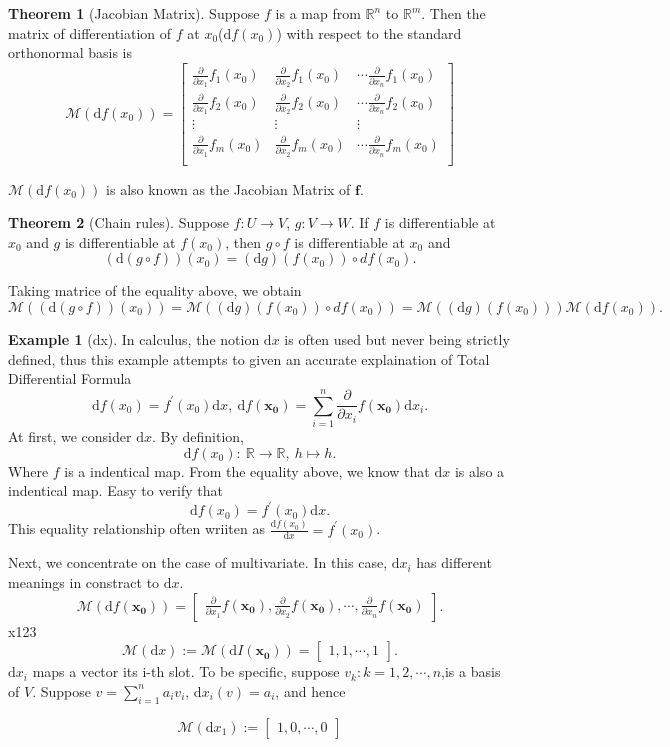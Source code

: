 \documentclass[12pt]{book}
\theoremstyle{definition}
\newtheorem{example}{Example}[chapter]
\newtheorem{theorem}{Theorem}[chapter]
\newcommand{\R}{\mathbb{R}}
\newcommand{\f}{\mathbf{f}}
\newcommand{\drm}{\mathrm{d}}
\newcommand{\M}{\mathcal{M}}
\newcommand{\pd}[1]{\frac{\partial}{\partial #1}}
\begin{document}
\begin{theorem}[Jacobian Matrix]
Suppose $f$ is a map from $\R^n$ to $\R^m$. Then the matrix of differentiation of $f$ at $x_0$($\drm f(x_0)$) with respect to the standard orthonormal basis is
$$
\mathcal{M}(\drm f(x_0)) = 
\begin{bmatrix}
	\pd{x_1}f_1(x_0) & \pd{x_2}f_1(x_0) & \cdots \pd{x_n}f_1(x_0) \\
	\pd{x_1}f_2(x_0) & \pd{x_2}f_2(x_0) & \cdots \pd{x_n}f_2(x_0) \\
	\vdots & \vdots  &\vdots \\
	\pd{x_1}f_m(x_0) & \pd{x_2}f_m(x_0) & \cdots \pd{x_n}f_m(x_0) \\
\end{bmatrix}
$$
\end{theorem}
$\mathcal{M}(\drm f(x_0))$ is also known as the Jacobian Matrix of $\f$.
\begin{theorem}[Chain rules]\label{Chain rules}
Suppose $f:U \to V$, $g:V \to W$. If $f$ is differentiable at $x_0$ and $g$ is differentiable at $f(x_0)$, then $g \circ f$ is differentiable at $x_0$ and 
$$
(\drm(g \circ f))(x_0) = (\drm g)(f(x_0)) \circ d f(x_0). 
$$
\end{theorem}
Taking matrice of the equality above, we obtain
$$
\mathcal{M}((\drm(g \circ f))(x_0))=\mathcal{M}((\drm g)(f(x_0)) \circ d f(x_0))= \mathcal{M}((\drm g)(f(x_0))) \mathcal{M}(\drm f(x_0)).
$$
\begin{example}[dx]
In calculus, the notion $\drm x$ is often used but never being strictly defined, thus this example attempts to given an accurate explaination of Total Differential Formula
$$
\drm f(x_0) = f^\prime(x_0)\drm x,\ \drm f(\mathbf{x_0}) = \sum_{i=1}^{n} \pd{x_i}f(\mathbf{x_0}) \drm x_i.   
$$
At first, we consider $\drm x$. By definition, 
$$
\drm f(x_0): \ \R \to \R,\  h \mapsto h. 
$$
Where $f$ is a indentical map. From the equality above, we know that $\drm x$ is also a  indentical map. Easy to verify that
$$
\drm f(x_0) = f^\prime(x_0)\drm x. 
$$
This equality relationship often wriiten as $\frac{\drm f(x_0)}{\drm x}=f^\prime(x_0)$. \par
Next, we concentrate on the case of multivariate. In this case, $\drm x_i$ has different meanings in constract to $\drm x$.
$$
\M(\drm f(\mathbf{x_0})) = \begin{bmatrix}
	\pd{x_1}f(\mathbf{x_0}), \pd{x_2}f(\mathbf{x_0}), \cdots, \pd{x_n}f(\mathbf{x_0})
\end{bmatrix}.
$$
x123
$$
\M(\drm x):= \M(\drm I(\mathbf{x_0})) = \begin{bmatrix}
	1,1,\cdots,1
\end{bmatrix}.
$$
$\drm x_i$ maps a vector its i-th slot. To be specific, suppose ${v_k:k=1,2,\cdots,n}$,is a basis of $V$. Suppose $v=\sum_{i=1}^n a_iv_i$, $\drm x_i(v)=a_i$, and hence

$$
\M(\drm x_1):= \begin{bmatrix}
	1,0,\cdots,0
\end{bmatrix}
$$ 
\end{example}
\end{document}
